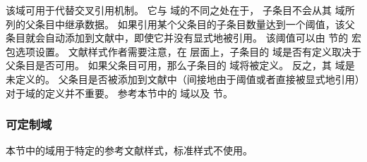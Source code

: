 \begin{fieldlist}

该域可用于代替交叉引用机制。
它与  域的不同之处在于，
子条目不会从其  域所列的父条目中继承数据。
如果引用某个父条目的子条目数量达到一个阈值，该父条目就会自动添加到文献中，即使它并没有显式地被引用。
该阈值可以由  节的  宏包选项设置。
文献样式作者需要注意，在 \biblatex 层面上，子条目的  域是否有定义取决于父条目是否可用。
如果父条目可用，那么子条目的  域将被定义。
反之，其  域是未定义的。
父条目是否被添加到文献中（间接地由于阈值或者直接被显式地引用）对于域的定义并不重要。
参考本节中的  域以及  节。


\end{fieldlist}

\subsubsection{可定制域}%
\label{bib:fld:ctm}


本节中的域用于特定的参考文献样式，标准样式不使用。

